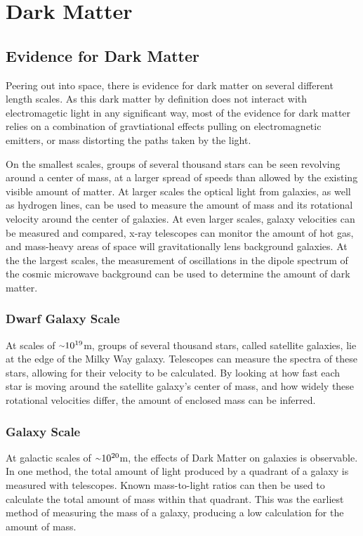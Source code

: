 \cleartooddpage[\thispagestyle{empty}]
\chapter{Dark Matter}

\section{Evidence for Dark Matter}

Peering out into space, there is evidence for dark matter on several different length scales.
As this dark matter by definition does not interact with electromagetic light in any significant way, most of the evidence for dark matter relies on a combination of gravtiational effects pulling on electromagnetic emitters, or mass distorting the paths taken by the light.

On the smallest scales, groups of several thousand stars can be seen revolving around a center of mass, at a larger spread of speeds than allowed by the existing visible amount of matter.
At larger scales the optical light from galaxies, as well as hydrogen lines, can be used to measure the amount of mass and its rotational velocity around the center of galaxies.
At even larger scales, galaxy velocities can be measured and compared, x-ray telescopes can monitor the amount of hot gas, and mass-heavy areas of space will gravitationally lens background galaxies.
At the the largest scales, the measurement of oscillations in the dipole spectrum of the cosmic microwave background can be used to determine the amount of dark matter.


\subsection{Dwarf Galaxy Scale}
At scales of $\nicetilde 10^{19}$m, groups of several thousand stars, called satellite galaxies, lie at the edge of the Milky Way galaxy.
Telescopes can measure the spectra of these stars, allowing for their velocity to be calculated.
By looking at how fast each star is moving around the satellite galaxy's center of mass, and how widely these rotational velocities differ, the amount of enclosed mass can be inferred.

\subsection{Galaxy Scale}
%
At galactic scales of $\nicetilde 10^{20}$m, the effects of Dark Matter on galaxies is observable.
In one method, the total amount of light produced by a quadrant of a galaxy is measured with telescopes.
Known mass-to-light ratios can then be used to calculate the total amount of mass within that quadrant.
This was the earliest method of measuring the mass of a galaxy, producing a low calculation for the amount of mass.


